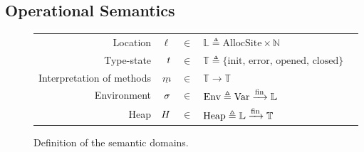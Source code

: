 \documentclass{article}
\begin{document}
\subsection{Operational Semantics}
\begin{figure}[h!]
  \centering
  \begin{tabular}{rrcll}
    Location                  & $\ell$          & $\in$ & $\mathbb{L}\triangleq\text{AllocSite}\times\mathbb{N}$       \\
    Type-state                & $t$      & $\in$ & $\mathbb{T}\triangleq\{\text{init, error, opened, closed}\}$ \\
    Interpretation of methods & $\underline{m}$ & $\in$ & $\mathbb{T}\rightarrow\mathbb{T}$                            \\
    Environment               & $\sigma$          & $\in$ & $\text{Env}\triangleq{\text{Var}}\xrightarrow{\text{fin}}{\mathbb{L}}$                   \\
    Heap                      & $H$          & $\in$ & $\text{Heap}\triangleq{\mathbb{L}}\xrightarrow{\text{fin}}{\mathbb{T}}$
  \end{tabular}
  \caption{Definition of the semantic domains.}
  \label{fig:domain}
\end{figure}
\end{document}
